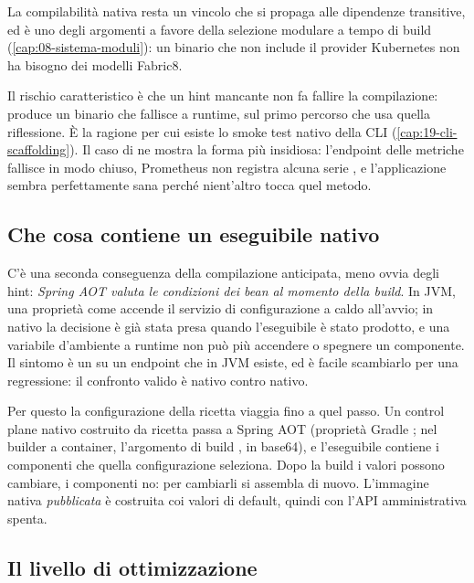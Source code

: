 La compilabilit\`a nativa resta un vincolo che si propaga alle dipendenze
transitive, ed \`e uno degli argomenti a favore della selezione modulare a
tempo di build (\cref{cap:08-sistema-moduli}): un binario che non include il
provider Kubernetes non ha bisogno dei modelli Fabric8.

Il rischio caratteristico \`e che un hint mancante non fa fallire la
compilazione: produce un binario che fallisce a runtime, sul primo percorso che
usa quella riflessione. \`E la ragione per cui esiste lo smoke test nativo della
CLI (\cref{cap:19-cli-scaffolding}). Il caso di 
ne mostra la forma pi\`u insidiosa: l'endpoint delle metriche fallisce in modo
chiuso, Prometheus non registra alcuna serie , e
l'applicazione sembra perfettamente sana perch\'e nient'altro tocca quel metodo.

\subsection{Che cosa contiene un eseguibile nativo}

C'\`e una seconda conseguenza della compilazione anticipata, meno ovvia degli
hint: \emph{Spring AOT valuta le condizioni dei bean al momento della build}. In
JVM, una propriet\`a come  accende
il servizio di configurazione a caldo all'avvio; in nativo la decisione \`e gi\`a
stata presa quando l'eseguibile \`e stato prodotto, e una variabile d'ambiente a
runtime non pu\`o pi\`u accendere o spegnere un componente. Il sintomo \`e
un  su un endpoint che in JVM esiste, ed \`e facile scambiarlo per
una regressione: il confronto valido \`e nativo contro nativo.

Per questo la configurazione della ricetta viaggia fino a quel passo. Un
control plane nativo costruito da ricetta passa  a
Spring AOT (propriet\`a Gradle ; nel builder a
container, l'argomento di build , in base64), e
l'eseguibile contiene i componenti che quella configurazione seleziona. Dopo
la build i valori possono cambiare, i componenti no: per cambiarli si assembla
di nuovo. L'immagine nativa \emph{pubblicata} \`e costruita coi valori di
default, quindi con l'API amministrativa spenta.

\subsection{Il livello di ottimizzazione}

